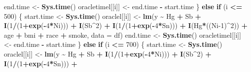\documentclass[12pt, twoside]{amherstthesis}
\newenvironment{Shaded}{\begin{snugshade}}{\end{snugshade}}
\newcommand{\AttributeTok}[1]{\textcolor[rgb]{0.13,0.29,0.53}{#1}}
\newcommand{\ControlFlowTok}[1]{\textcolor[rgb]{0.13,0.29,0.53}{\textbf{#1}}}
\newcommand{\DecValTok}[1]{\textcolor[rgb]{0.00,0.00,0.81}{#1}}
\newcommand{\FunctionTok}[1]{\textcolor[rgb]{0.13,0.29,0.53}{\textbf{#1}}}
\newcommand{\NormalTok}[1]{#1}
\newcommand{\OtherTok}[1]{\textcolor[rgb]{0.56,0.35,0.01}{#1}}
\newcommand{\SpecialCharTok}[1]{\textcolor[rgb]{0.81,0.36,0.00}{\textbf{#1}}}
\begin{document}
\begin{Shaded}
\begin{Highlighting}[]
\NormalTok{      end.time }\OtherTok{\textless{}{-}} \FunctionTok{Sys.time}\NormalTok{()}
\NormalTok{      oracletimel[[i]] }\OtherTok{\textless{}{-}}\NormalTok{ end.time }\SpecialCharTok{{-}}\NormalTok{ start.time}
\NormalTok{    \} }\ControlFlowTok{else} \ControlFlowTok{if}\NormalTok{ (i }\SpecialCharTok{\textless{}=} \DecValTok{500}\NormalTok{) \{}
\NormalTok{      start.time }\OtherTok{\textless{}{-}} \FunctionTok{Sys.time}\NormalTok{()}
\NormalTok{      oraclel[[i]] }\OtherTok{\textless{}{-}} \FunctionTok{lm}\NormalTok{(y }\SpecialCharTok{\textasciitilde{}}\NormalTok{ Hg }\SpecialCharTok{+}\NormalTok{ Sb }\SpecialCharTok{+}
                           \FunctionTok{I}\NormalTok{(}\DecValTok{1}\SpecialCharTok{/}\NormalTok{(}\DecValTok{1}\SpecialCharTok{+}\FunctionTok{exp}\NormalTok{(}\SpecialCharTok{{-}}\DecValTok{4}\SpecialCharTok{*}\NormalTok{Ni))) }\SpecialCharTok{+} \FunctionTok{I}\NormalTok{(Sb}\SpecialCharTok{\^{}}\DecValTok{2}\NormalTok{) }\SpecialCharTok{+} \FunctionTok{I}\NormalTok{(}\DecValTok{1}\SpecialCharTok{/}\NormalTok{(}\DecValTok{1}\SpecialCharTok{+}\FunctionTok{exp}\NormalTok{(}\SpecialCharTok{{-}}\DecValTok{4}\SpecialCharTok{*}\NormalTok{Sn))) }\SpecialCharTok{+}
                           \FunctionTok{I}\NormalTok{(Hg}\SpecialCharTok{*}\NormalTok{((Ni}\DecValTok{{-}1}\NormalTok{)}\SpecialCharTok{\^{}}\DecValTok{2}\NormalTok{)) }\SpecialCharTok{+} 
\NormalTok{                           age }\SpecialCharTok{+}\NormalTok{ bmi }\SpecialCharTok{+}\NormalTok{ race }\SpecialCharTok{+}\NormalTok{ smoke, }\AttributeTok{data =}\NormalTok{ df)}
\NormalTok{      end.time }\OtherTok{\textless{}{-}} \FunctionTok{Sys.time}\NormalTok{()}
\NormalTok{      oracletimel[[i]] }\OtherTok{\textless{}{-}}\NormalTok{ end.time }\SpecialCharTok{{-}}\NormalTok{ start.time}
\NormalTok{    \} }\ControlFlowTok{else} \ControlFlowTok{if}\NormalTok{ (i }\SpecialCharTok{\textless{}=} \DecValTok{700}\NormalTok{) \{}
\NormalTok{      start.time }\OtherTok{\textless{}{-}} \FunctionTok{Sys.time}\NormalTok{()}
\NormalTok{      oraclel[[i]] }\OtherTok{\textless{}{-}} \FunctionTok{lm}\NormalTok{(y }\SpecialCharTok{\textasciitilde{}}\NormalTok{ Hg }\SpecialCharTok{+}\NormalTok{ Sb }\SpecialCharTok{+}
                           \FunctionTok{I}\NormalTok{(}\DecValTok{1}\SpecialCharTok{/}\NormalTok{(}\DecValTok{1}\SpecialCharTok{+}\FunctionTok{exp}\NormalTok{(}\SpecialCharTok{{-}}\DecValTok{4}\SpecialCharTok{*}\NormalTok{Ni))) }\SpecialCharTok{+} \FunctionTok{I}\NormalTok{(Sb}\SpecialCharTok{\^{}}\DecValTok{2}\NormalTok{) }\SpecialCharTok{+} \FunctionTok{I}\NormalTok{(}\DecValTok{1}\SpecialCharTok{/}\NormalTok{(}\DecValTok{1}\SpecialCharTok{+}\FunctionTok{exp}\NormalTok{(}\SpecialCharTok{{-}}\DecValTok{4}\SpecialCharTok{*}\NormalTok{Sn))) }\SpecialCharTok{+}

\end{Highlighting}
\end{Shaded}
\end{document}
